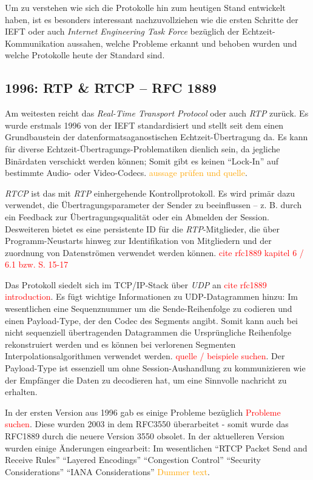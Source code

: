 \documentclass{IEEEtran}
\begin{document}
\begin{twocolumn}
Um zu verstehen wie sich die Protokolle hin zum heutigen Stand entwickelt
haben, ist es besonders interessant nachzuvollziehen wie die ersten Schritte
der IEFT oder auch \textit{Internet Engineering Task Force} bezüglich der
Echtzeit-Kommunikation aussahen, welche Probleme erkannt und behoben wurden und
welche Protokolle heute der Standard sind.

\subsection{1996: RTP \& RTCP – RFC 1889}

Am weitesten reicht das \textit{Real-Time Transport Protocol} oder auch
\textit{RTP} zurück. Es wurde erstmals 1996 von der IEFT standardisiert und
stellt seit dem einen Grundbaustein der datenformatsaganostischen
Echtzeit-Übertragung da. Es kann für diverse
Echtzeit-Übertragungs-Problematiken dienlich sein, da jegliche Binärdaten
verschickt werden können; Somit gibt es keinen ``Lock-In'' auf bestimmte Audio-
oder Video-Codecs. \textcolor{orange}{aussage prüfen und quelle}.

\textit{RTCP} ist das mit \textit{RTP} einhergehende Kontrollprotokoll. Es
wird primär dazu verwendet, die Übertragungsparameter der Sender zu
beeinflussen – z. B. durch ein Feedback zur Übertragungsqualität oder ein
Abmelden der Session. Desweiteren bietet es eine persistente ID für die
\textit{RTP}-Mitglieder, die über Programm-Neustarts hinweg zur Identifikation
von Mitgliedern und der zuordnung von Datenströmen verwendet werden können.
\textcolor{red}{cite rfc1889 kapitel 6 / 6.1 bzw. S. 15-17}

Das Protokoll siedelt sich im TCP/IP-Stack über \textit{UDP} an
\textcolor{red}{cite rfc1889 introduction}. Es fügt wichtige Informationen zu
UDP-Datagrammen hinzu: Im wesentlichen eine Sequenznummer um die
Sende-Reihenfolge zu codieren und einen Payload-Type, der den Codec des
Segments angibt. Somit kann auch bei nicht sequenziell übertragenden
Datagrammen die Ursprüngliche Reihenfolge rekonstruiert werden und es können
bei verlorenen Segmenten Interpolationsalgorithmen verwendet werden.
\textcolor{red}{quelle / beispiele suchen}. Der Payload-Type ist essenziell um
ohne Session-Aushandlung zu kommunizieren wie der Empfänger die Daten zu
decodieren hat, um eine Sinnvolle nachricht zu erhalten.

In der ersten Version aus 1996 gab es einige Probleme bezüglich
\textcolor{red}{Probleme suchen}. Diese wurden 2003 in dem RFC3550
überarbeitet - somit wurde das RFC1889 durch die neuere Version 3550 obsolet.
In der aktuelleren Version wurden einige Änderungen eingearbeit: Im
wesentlichen ``RTCP Packet Send and Receive Rules'' ``Layered Encodings''
``Congestion Control'' ``Security Considerations'' ``IANA Considerations''
\textcolor{orange}{Dummer text}.


\end{twocolumn}
\end{document}
